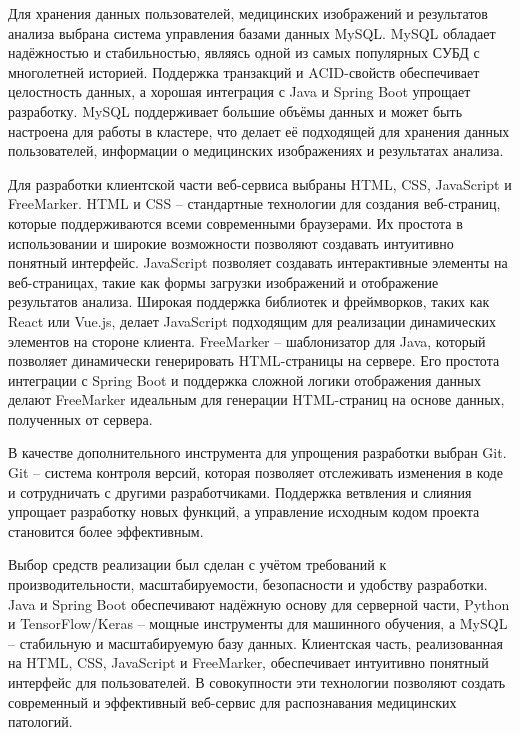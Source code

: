 {  \par \redline Для хранения данных пользователей, медицинских изображений и результатов анализа выбрана система управления базами данных MySQL. MySQL обладает надёжностью и стабильностью, являясь одной из самых популярных СУБД с многолетней историей. Поддержка транзакций и ACID-свойств обеспечивает целостность данных, а хорошая интеграция с Java и Spring Boot упрощает разработку. MySQL поддерживает большие объёмы данных и может быть настроена для работы в кластере, что делает её подходящей для хранения данных пользователей, информации о медицинских изображениях и результатах анализа.

  \par \redline Для разработки клиентской части веб-сервиса выбраны HTML, CSS, JavaScript и FreeMarker. HTML и CSS – стандартные технологии для создания веб-страниц, которые поддерживаются всеми современными браузерами. Их простота в использовании и широкие возможности позволяют создавать интуитивно понятный интерфейс. JavaScript позволяет создавать интерактивные элементы на веб-страницах, такие как формы загрузки изображений и отображение результатов анализа. Широкая поддержка библиотек и фреймворков, таких как React или Vue.js, делает JavaScript подходящим для реализации динамических элементов на стороне клиента. FreeMarker – шаблонизатор для Java, который позволяет динамически генерировать HTML-страницы на сервере. Его простота интеграции с Spring Boot и поддержка сложной логики отображения данных делают FreeMarker идеальным для генерации HTML-страниц на основе данных, полученных от сервера.

  \par \redline В качестве дополнительного инструмента для упрощения разработки выбран Git. Git – система контроля версий, которая позволяет отслеживать изменения в коде и сотрудничать с другими разработчиками. Поддержка ветвления и слияния упрощает разработку новых функций, а управление исходным кодом проекта становится более эффективным.

  \par \redline Выбор средств реализации был сделан с учётом требований к производительности, масштабируемости, безопасности и удобству разработки. Java и Spring Boot обеспечивают надёжную основу для серверной части, Python и TensorFlow/Keras – мощные инструменты для машинного обучения, а MySQL – стабильную и масштабируемую базу данных. Клиентская часть, реализованная на HTML, CSS, JavaScript и FreeMarker, обеспечивает интуитивно понятный интерфейс для пользователей. В совокупности эти технологии позволяют создать современный и эффективный веб-сервис для распознавания медицинских патологий.

  \par
}